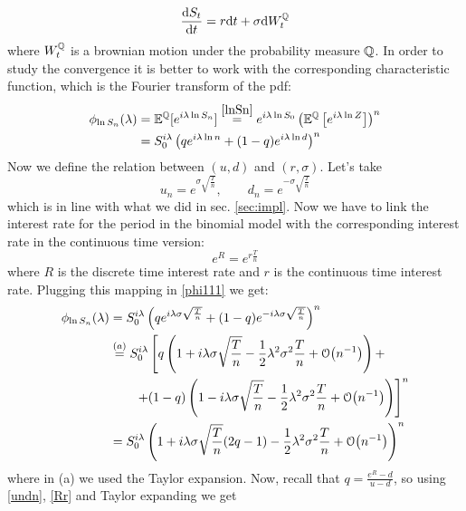\begin{equation}\label{geom_brow}
    \dv{S_t}{t} = r\dd t + \sigma\dd W^{\mathbb{Q}}_t
\end{equation}
where $W^{\mathbb{Q}}_t$ is a brownian motion under the probability measure ${\mathbb{Q}}$. In order to study the convergence it is better to work with the corresponding characteristic function, which is the Fourier transform of the pdf:
\begin{align}\label{phi111}
    \notag \phi_{\ln S_n}(\lambda)
    &=
    \mathbb{E}^{\mathbb{Q}}[e^{i\lambda\ln S_n}] \overset{\eqref{lnSn}}{=} e^{i\lambda\ln S_0}\left(\mathbb{E}^{\mathbb{Q}}\left[e^{i\lambda\ln Z}\right]\right)^n \\
    &= S_0^{i\lambda}\left(qe^{i\lambda\ln n}+(1-q)e^{i\lambda\ln d}\right)^n
\end{align}
Now we define the relation between $(u,d)$ and $(r,\sigma)$. Let's take
\begin{equation}\label{undn}
    u_n=e^{\sigma\sqrt{\frac{T}{n}}}, \qquad d_n=e^{-\sigma\sqrt{\frac{T}{n}}}
\end{equation}
which is in line with what we did in sec. \ref{sec:impl}. Now we have to link the interest rate for the period in the binomial model with the corresponding interest rate in the continuous time version:
\begin{equation}\label{Rr}
    e^R = e^{r\frac{T}{n}}
\end{equation}
where $R$ is the discrete time interest rate and $r$ is the continuous time interest rate. Plugging this mapping in \eqref{phi111} we get:
\begin{align}\label{phi222}
    \notag \phi_{\ln S_n}(\lambda) 
    &=
    S_0^{i\lambda}\left(qe^{i\lambda\sigma\sqrt{\frac{T}{n}}}+(1-q)e^{-i\lambda\sigma\sqrt{\frac{T}{n}}}\right)^n \\
    &\overset{(a)}{=}
    \notag S_0^{i\lambda}\left[q
    \left(
    1+i\lambda\sigma\sqrt{\frac{T}{n}}-\frac{1}{2}\lambda^2\sigma^2\frac{T}{n}+\order{n^{-1}}
    \right) + \right. \\
    &\notag\qquad
    \left.+(1-q)\left(
    1-i\lambda\sigma\sqrt{\frac{T}{n}}-\frac{1}{2}\lambda^2\sigma^2\frac{T}{n}+\order{n^{-1}}
    \right)
    \right]^n \\
    &= 
    S_0^{i\lambda}\left(1+i\lambda\sigma\sqrt{\frac{T}{n}}(2q-1)-\frac{1}{2}\lambda^2\sigma^2\frac{T}{n}+\order{n^{-1}}\right)^n
\end{align}
where in (a) we used the Taylor expansion. Now, recall that $q = \frac{e^R-d}{u-d}$, so using \eqref{undn}, \eqref{Rr} and Taylor expanding we get
